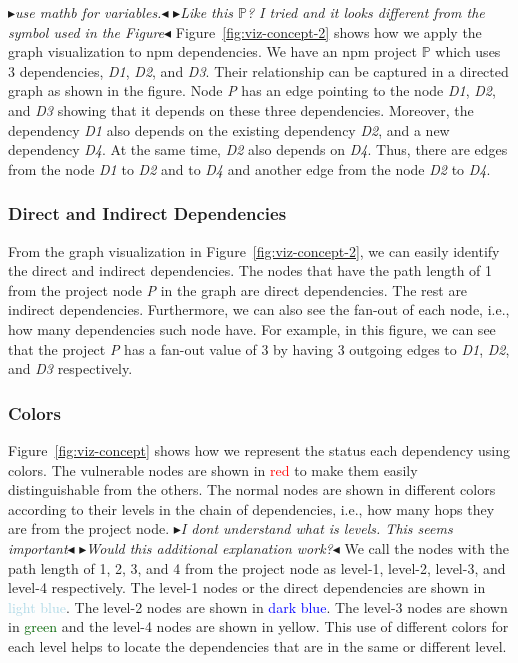 \documentclass[conference]{IEEEtran}
\newcommand{\boxedtext}[1]{\fbox{\scriptsize\bfseries\textsf{#1}}}
\newcommand{\nota}[2]{
	\boxedtext{#1}
	{\small$\blacktriangleright$\emph{\textsl{#2}}$\blacktriangleleft$}
}
\newcommand{\todo}[1]{{\color{red}\nota{TODO}{#1}}}
\begin{document}
	\todo{use mathb for variables.} \todo{Like this $\mathbb{P}$? I tried and it looks different from the symbol used in the Figure}
	Figure~\ref{fig:viz-concept-2} shows how we apply the graph visualization to npm dependencies. We have an npm project $\mathbb{P}$ which uses 3 dependencies, \textit{D1}, \textit{D2}, and \textit{D3}. Their relationship can be captured in a directed graph as shown in the figure. Node \textit{P} has an edge pointing to the node \textit{D1}, \textit{D2}, and \textit{D3} showing that it depends on these three dependencies. Moreover, the dependency \textit{D1} also depends on the existing dependency \textit{D2}, and a new dependency \textit{D4}. At the same time, \textit{D2} also depends on \textit{D4}. Thus, there are edges from the node \textit{D1} to \textit{D2} and to \textit{D4} and another edge from the node \textit{D2} to \textit{D4}. 
	
	\subsubsection{Direct and Indirect Dependencies}
	From the graph visualization in Figure~\ref{fig:viz-concept-2}, we can easily identify the direct and indirect dependencies. The nodes that have the path length of 1 from the project node \textit{P} in the graph are direct dependencies. The rest are indirect dependencies. Furthermore, we can also see the fan-out of each node, i.e., how many dependencies such node have.  For example, in this figure, we can see that the project \textit{P} has a fan-out value of 3 by having 3 outgoing edges to \textit{D1}, \textit{D2}, and \textit{D3} respectively.
	
	
	
	\subsubsection{Colors}
	Figure~\ref{fig:viz-concept} shows how we represent the status each dependency using colors.
	The vulnerable nodes are shown in \textcolor{red}{red} to make them easily distinguishable from the others. The normal nodes are shown in different colors according to their levels in the chain of dependencies, i.e., how many hops they are from the project node. 
	\todo{I dont understand what is levels. This seems important} \todo{Would this additional explanation work?}
	We call the nodes with the path length of 1, 2, 3, and 4 from the project node as level-1, level-2, level-3, and level-4 respectively. The level-1 nodes or the direct dependencies are shown in \textcolor{lightblue}{light blue}. The level-2 nodes are shown in \textcolor{blue}{dark blue}. The level-3 nodes are shown in \textcolor{darkgreen}{green} and the level-4 nodes are shown in \textcolor{darkyellow}{yellow}. This use of different colors for each level helps to locate the dependencies that are in the same or different level.
	
\end{document}
